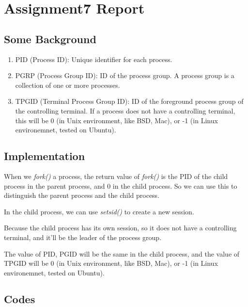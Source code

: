 \chapter{Assignment7 Report}


\section{Some Background}
\begin{enumerate}
\item PID (Process ID): Unique identifier for each process.
\item PGRP (Process Group ID): ID of the process group. A process group is a collection of one or more processes.
\item TPGID (Terminal Process Group ID): ID of the foreground process group of the controlling terminal. If a process does not have a controlling terminal, this will be 0 (in Unix environment, like BSD, Mac), or -1 (in Linux environemnet, tested on Ubuntu).
\end{enumerate}

\section{Implementation}
When we \textit{fork()} a process, the return value of \textit{fork()} is the PID of the child process in the parent process, and 0 in the child process.
So we can use this to distinguish the parent process and the child process.

In the child process, we can use \textit{setsid()} to create a new session.

Because the child process has its own session, so it does not have a controlling terminal, and it'll be the leader of the process group.

The value of PID, PGID will be the same in the child process, and the value of TPGID will be 0 (in Unix environment, like BSD, Mac), or -1 (in Linux environemnet, tested on Ubuntu).

\newpage


\section{Codes}

\newpage


\newpage


